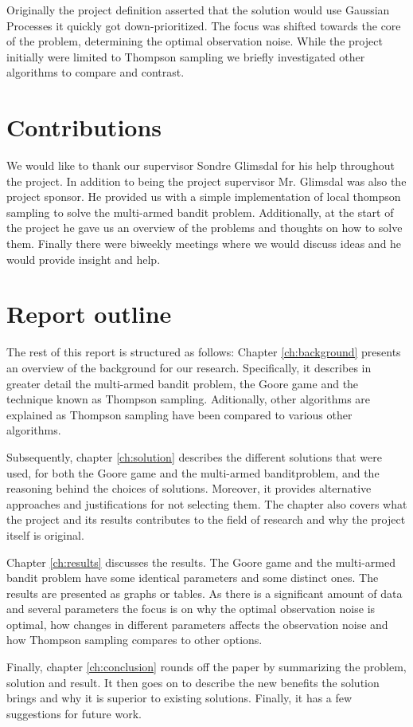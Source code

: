 Originally the project definition asserted that the solution would use Gaussian Processes it quickly got down-prioritized.
The focus was shifted towards the core of the problem, determining the optimal observation noise. While
the project initially were limited to Thompson sampling we briefly investigated other algorithms to compare
and contrast. 

\section{Contributions}
We would like to thank our supervisor Sondre Glimsdal for his help throughout the project. In addition to
being the project supervisor Mr. Glimsdal was also the project sponsor. He provided us with a simple
implementation of local thompson sampling to solve the multi-armed bandit problem. Additionally, at the 
start of the project he gave us an overview of the problems and thoughts on 
how to solve them. Finally there were biweekly meetings where we would discuss ideas and he would 
provide insight and help.

\section{Report outline}
The rest of this report is structured as follows: Chapter
\ref{ch:background} presents an overview of the background for our research.
Specifically, it describes in greater detail the multi-armed bandit problem, the Goore game and the
technique known as Thompson sampling. Aditionally, other algorithms are explained as Thompson sampling
have been compared to various other algorithms.

Subsequently, chapter \ref{ch:solution} describes the different solutions that were used, for both the Goore game
and the multi-armed banditproblem, and the reasoning behind the choices of solutions. Moreover, it provides 
alternative approaches and justifications for not selecting them. The chapter also covers what the project
and its results contributes to the field of research and why the project itself is original. 

Chapter \ref{ch:results} discusses the results. The Goore game and the multi-armed bandit problem have some
identical parameters and some distinct ones. The results are presented as graphs or tables. As there is a significant
amount of data and several parameters the focus is on why the optimal observation noise is optimal, how changes
in different parameters affects the observation noise and how Thompson sampling compares to other options.

Finally, chapter \ref{ch:conclusion} rounds off the paper by summarizing the problem, solution and result. It then goes
on to describe the new benefits the solution brings and why it is superior to existing solutions. Finally, it has a few 
suggestions for future work. 
